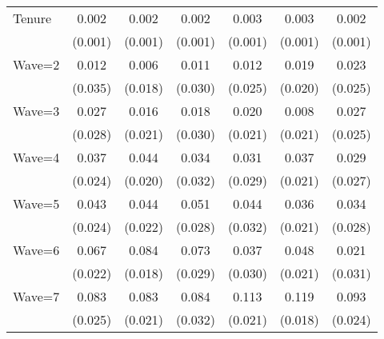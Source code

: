 {\begin{tabular}{l*{6}{c}}
Tenure              &       0.002\sym{**} &       0.002\sym{**} &       0.002\sym{**} &       0.003\sym{***}&       0.003\sym{***}&       0.002\sym{***}\\
                    &     (0.001)         &     (0.001)         &     (0.001)         &     (0.001)         &     (0.001)         &     (0.001)         \\
Wave=2              &       0.012         &       0.006         &       0.011         &       0.012         &       0.019         &       0.023         \\
                    &     (0.035)         &     (0.018)         &     (0.030)         &     (0.025)         &     (0.020)         &     (0.025)         \\
Wave=3              &       0.027         &       0.016         &       0.018         &       0.020         &       0.008         &       0.027         \\
                    &     (0.028)         &     (0.021)         &     (0.030)         &     (0.021)         &     (0.021)         &     (0.025)         \\
Wave=4              &       0.037         &       0.044\sym{**} &       0.034         &       0.031         &       0.037\sym{*}  &       0.029         \\
                    &     (0.024)         &     (0.020)         &     (0.032)         &     (0.029)         &     (0.021)         &     (0.027)         \\
Wave=5              &       0.043\sym{*}  &       0.044\sym{**} &       0.051\sym{*}  &       0.044         &       0.036\sym{*}  &       0.034         \\
                    &     (0.024)         &     (0.022)         &     (0.028)         &     (0.032)         &     (0.021)         &     (0.028)         \\
Wave=6              &       0.067\sym{***}&       0.084\sym{***}&       0.073\sym{**} &       0.037         &       0.048\sym{**} &       0.021         \\
                    &     (0.022)         &     (0.018)         &     (0.029)         &     (0.030)         &     (0.021)         &     (0.031)         \\
Wave=7              &       0.083\sym{***}&       0.083\sym{***}&       0.084\sym{***}&       0.113\sym{***}&       0.119\sym{***}&       0.093\sym{***}\\
                    &     (0.025)         &     (0.021)         &     (0.032)         &     (0.021)         &     (0.018)         &     (0.024)         \\

\end{tabular}}
